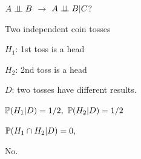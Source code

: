 \documentclass[handout,fleqn,aspectratio=169]{beamer}
\begin{document}
\begin{frame}{$A \perp \!\!\! \perp B$ $\rightarrow$  $A \perp \!\!\! \perp B | C$?}

\plitemsep 0.2in
\bci 

\item<1-> Two independent coin tosses

\plitemsep 0.05in
\bci
\item $H_1$: 1st toss is a head
\item $H_2$: 2nd toss is a head
\item $D$: two tosses have different results.
\eci

\item<2-> $\mathbb{P}( H_1 | D ) = 1/2,$ $\mathbb{P}( H_2 | D ) = 1/2$  


\item<3-> $\mathbb{P}( H_1 \cap H_2 | D ) = 0,$  

\item<3-> No.
\eci 
\end{frame}
\end{document}
